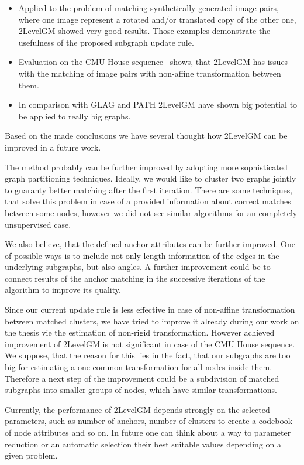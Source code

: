 \begin{itemize}
\item Applied to the problem of matching synthetically generated image pairs, where one image represent a rotated and/or translated copy of the other one, 2LevelGM showed very good results.
Those examples demonstrate the usefulness of the proposed subgraph update rule.
\item Evaluation on the CMU House sequence~\cite{CMUHouse} shows, that 2LevelGM has issues with the matching of image pairs with non-affine transformation between them.
\item In comparison with GLAG and PATH 2LevelGM have shown big potential to be applied to really big graphs.
\end{itemize}

Based on the made conclusions we have several thought how 2LevelGM can be improved in a future work. %

The method probably can be further improved by adopting more sophisticated graph partitioning techniques. Ideally, we would like to cluster two graphs jointly to guaranty better matching after the first iteration. There are some techniques, that solve this problem in case of a provided information about correct matches between some nodes, however we did not see similar algorithms for an completely unsupervised case.

We also believe, that the defined anchor attributes can be further improved. One of possible ways is to include not only length information of the edges in the underlying subgraphs, but also angles. A further improvement could be to connect results of the anchor matching in the successive iterations of the algorithm to improve its quality.

Since our current update rule is less effective in case of non-affine transformation between matched clusters, we have tried to improve it already during our work on the thesis vie the estimation of non-rigid transformation. However achieved improvement of 2LevelGM is not significant in case of the CMU House sequence. We suppose, that the reason for this lies in the fact, that our subgraphs are too big for estimating a one common transformation for all nodes inside them. Therefore a next step of the improvement could be a subdivision of matched subgraphs into smaller groups of nodes, which have similar transformations.

Currently, the performance of 2LevelGM depends strongly on the selected parameters, such as number of anchors, number of clusters to create a codebook of node attributes and so on. In future one can think about a way to parameter reduction or an automatic selection their best suitable values depending on a given problem. %

